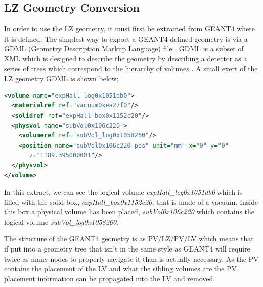 \subsection{LZ Geometry Conversion}
\par
In order to use the LZ geometry, it must first be extracted from GEANT4 where it is defined.
The simplest way to export a GEANT4 defined geometry is via a GDML (Geometry Description Markup Language) file \cite{GDML_USER_GUIDE_ref}.
GDML is a subset of XML which is designed to describe the geometry by describing a detector as a series of trees which correspond to the hierarchy of volumes \cite{GDML_USER_GUIDE_ref}.
A small exert of the LZ geometry GDML is shown below;
\begin{lstlisting}[backgroundcolor=\color{lightgrey},
                   language=XML, xleftmargin = 0.5cm]
<volume name="expHall_log0x1051db0">
  <materialref ref="vacuum0xea27f0"/>
  <solidref ref="expHall_box0x1152c20"/>
  <physvol name="subVol0x106c220">
    <volumeref ref="subVol_log0x1058260"/>
    <position name="subVol0x106c220_pos" unit="mm" x="0" y="0"
       z="1189.395000001"/>
  </physvol>
</volume>
\end{lstlisting}
In this extract, we can see the logical volume \textit{expHall\_log0x1051db0} which is filled with the solid box, \textit{expHall\_box0x1152c20}, that is made of a vacuum.
Inside this box a physical volume has been placed, \textit{subVol0x106c220} which contains the logical volume \textit{subVol\_log0x1058260}.
\par
The structure of the GEANT4 geometry is as PV/LZ/PV/LV which means that if put into a geometry tree that isn't in the same style as GEANT4 will require twice as many nodes to properly navigate it than is actually necessary.
As the PV contains the placement of the LV and what the sibling volumes are the PV placement information can be propagated into the LV and removed.


